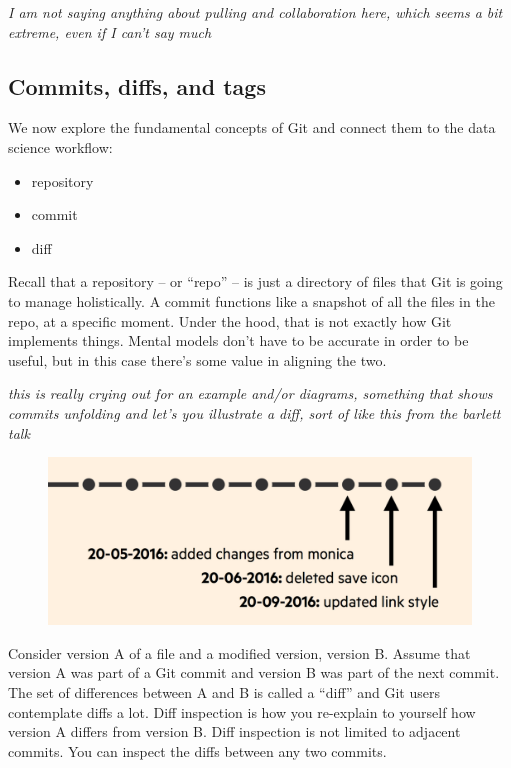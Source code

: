 \documentclass[12pt]{article}
\providecommand{\tightlist}{%
  \setlength{\itemsep}{0pt}\setlength{\parskip}{0pt}}
\begin{document}
\emph{I am not saying anything about pulling and collaboration here,
which seems a bit extreme, even if I can't say much}

\subsection{Commits, diffs, and tags}\label{commits-diffs-and-tags}

We now explore the fundamental concepts of Git and connect them to the
data science workflow:

\begin{itemize}
\tightlist
\item
  repository
\item
  commit
\item
  diff
\end{itemize}

Recall that a repository -- or ``repo'' -- is just a directory of files
that Git is going to manage holistically. A commit functions like a
snapshot of all the files in the repo, at a specific moment. Under the
hood, that is not exactly how Git implements things. Mental models don't
have to be accurate in order to be useful, but in this case there's some
value in aligning the two.

\emph{this is really crying out for an example and/or diagrams,
something that shows commits unfolding and let's you illustrate a diff,
sort of like this from the barlett talk}

\begin{figure}
\centering
\includegraphics{bartlett-commit-history.png}
\caption{}
\end{figure}

Consider version A of a file and a modified version, version B. Assume
that version A was part of a Git commit and version B was part of the
next commit. The set of differences between A and B is called a ``diff''
and Git users contemplate diffs a lot. Diff inspection is how you
re-explain to yourself how version A differs from version B. Diff
inspection is not limited to adjacent commits. You can inspect the diffs
between any two commits.
\end{document}
